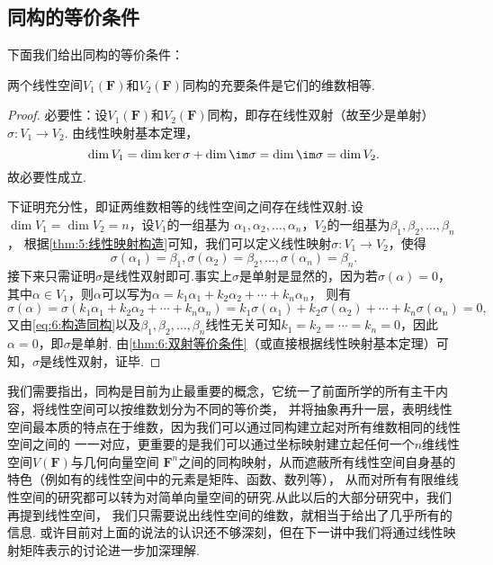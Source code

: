 \subsection{同构的等价条件}
下面我们给出同构的等价条件：
\begin{theorem}\label{thm:6:同构的等价条件}
    两个线性空间$V_1(\mathbf{F})$和$V_2(\mathbf{F})$同构的充要条件是它们的维数相等.
\end{theorem}

\begin{proof}
    必要性：设$V_1(\mathbf{F})$和$V_2(\mathbf{F})$同构，即存在线性双射（故至少是单射）$\sigma:V_1\to V_2$.
    由线性映射基本定理，
    \[\dim V_1=\dim\ker\sigma+\dim\im\sigma=\dim\im\sigma=\dim V_2.\]
    故必要性成立.

    下证明充分性，即证两维数相等的线性空间之间存在线性双射.设$\dim V_1=\dim V_2=n$，设$V_1$的一组基为
    $\alpha_1,\alpha_2,\ldots,\alpha_n$，$V_2$的一组基为$\beta_1,\beta_2,\ldots,\beta_n$，
    根据\autoref{thm:5:线性映射构造}可知，我们可以定义线性映射$\sigma:V_1\to V_2$，使得
    \begin{equation}\label{eq:6:构造同构}
        \sigma(\alpha_1)=\beta_1,\sigma(\alpha_2)=\beta_2,\ldots,\sigma(\alpha_n)=\beta_n.
    \end{equation}
    接下来只需证明$\sigma$是线性双射即可.事实上$\sigma$是单射是显然的，因为若$\sigma(\alpha)=0$，
    其中$\alpha\in V_1$，则$\alpha$可以写为$\alpha=k_1\alpha_1+k_2\alpha_2+\cdots+k_n\alpha_n$，
    则有
    \[\sigma(\alpha)=\sigma(k_1\alpha_1+k_2\alpha_2+\cdots+k_n\alpha_n)=k_1\sigma(\alpha_1)+k_2\sigma(\alpha_2)+\cdots+k_n\sigma(\alpha_n)=0,\]
    又由\autoref{eq:6:构造同构}以及$\beta_1,\beta_2,\ldots,\beta_n$线性无关可知$k_1=k_2=\cdots=k_n=0$，因此$\alpha=0$，即$\sigma$是单射.
    由\autoref{thm:6:双射等价条件}（或直接根据线性映射基本定理）可知，$\sigma$是线性双射，证毕.
\end{proof}

我们需要指出，同构是目前为止最重要的概念，它统一了前面所学的所有主干内容，将线性空间可以按维数划分为不同的等价类，
并将抽象再升一层，表明线性空间最本质的特点在于维数，因为我们可以通过同构建立起对所有维数相同的线性空间之间的
一一对应，更重要的是我们可以通过坐标映射建立起任何一个$n$维线性空间$V(\mathbf{F})$与几何向量空间
$\mathbf{F}^n$之间的同构映射，从而遮蔽所有线性空间自身基的特色（例如有的线性空间中的元素是矩阵、函数、数列等），
从而对所有有限维线性空间的研究都可以转为对简单向量空间的研究.从此以后的大部分研究中，我们再提到线性空间，
我们只需要说出线性空间的维数，就相当于给出了几乎所有的信息.
或许目前对上面的说法的认识还不够深刻，但在下一讲中我们将通过线性映射矩阵表示的讨论进一步加深理解.

